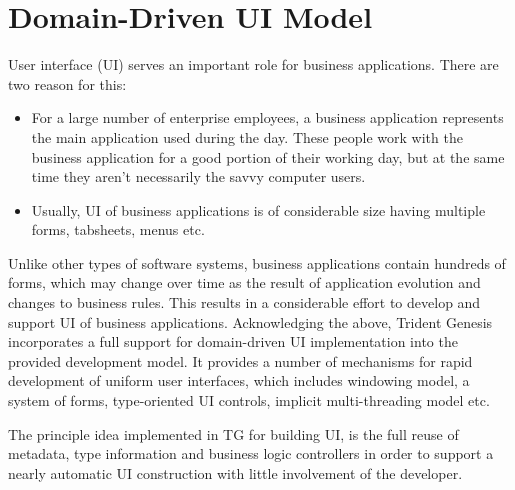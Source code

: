 \section{Domain-Driven UI Model}\label{sec:05}

  User interface (UI) serves an important role for business applications.
  There are two reason for this:
  \begin{itemize}
   \item For a large number of enterprise employees, a business application represents the main application used during the day. 
	 These people work with the business application for a good portion of their working day, but at the same time they aren't necessarily the savvy computer users.
   \item Usually, UI of business applications is of considerable size having multiple forms, tabsheets, menus etc.
  \end{itemize}
  Unlike other types of software systems, business applications contain hundreds of forms, which may change over time as the result of application evolution and changes to business rules.
  This results in a considerable effort to develop and support UI of business applications.
  Acknowledging the above, Trident Genesis incorporates a full support for domain-driven UI implementation into the provided development model.
  It provides a number of mechanisms for rapid development of uniform user interfaces, which includes windowing model, a system of forms, type-oriented UI controls, implicit multi-threading model etc.
  
  The principle idea implemented in TG for building UI, is the full reuse of metadata, type information and business logic controllers in order to support a nearly automatic UI construction with little involvement of the developer.

  